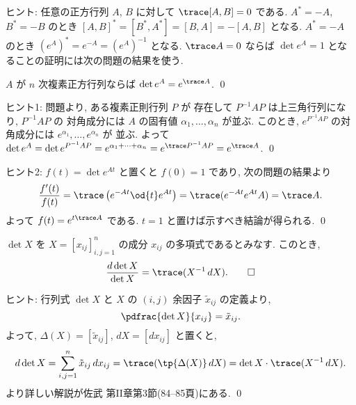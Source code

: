 \documentclass[12pt,twoside]{jarticle}
\begin{document}
\noindent
ヒント: 任意の正方行列 $A$, $B$ に対して $\trace[A,B]=0$ である.
$A^*=-A$, $B^*=-B$ のとき $[A,B]^*=[B^*,A^*]=[B,A]=-[A,B]$ となる.
$A^*=-A$ のとき $(e^A)^* = e^{-A}=(e^A)^{-1}$ となる.
$\trace A=0$ ならば $\det e^A = 1$ となることの証明には次の問題の結果を使う.


\begin{question}
  $A$ が $n$ 次複素正方行列ならば $\det e^A = e^{\trace A}$. \qed
\end{question}

\noindent
ヒント1: 問題より, ある複素正則行列 $P$ が
存在して $P^{-1}AP$ は上三角行列になり, $P^{-1}AP$ の
対角成分には $A$ の固有値 $\alpha_1,\dots,\alpha_n$ が並ぶ.
このとき, $e^{P^{-1}AP}$ の対角成分には $e^{\alpha_1},\dots,e^{\alpha_n}$ が
並ぶ.  よって $\det e^A = \det e^{P^{-1}AP} = e^{\alpha_1+\cdots+\alpha_n}
= e^{\trace P^{-1}AP} = e^{\trace A}$. 
\qed

\medskip
\noindent
ヒント2: $f(t)=\det e^{At}$ と置くと $f(0)=1$ であり, 
次の問題の結果より
\begin{equation*}
  \frac{f'(t)}{f(t)} 
  = \trace\left(e^{-At}\od{t}e^{At}\right) 
  = \trace(e^{-At}e^{At}A) 
  = \trace A.
\end{equation*}
よって $f(t)=e^{t\trace A}$ である. $t=1$ と置けば示すべき結論が得られる.
\qed


\begin{question}
\label{q:ddet}
  $\det X$ を $X=[x_{ij}]_{i,j=1}^n$ の成分 $x_{ij}$ の多項式であるとみなす.
  このとき,
  \begin{equation*}
    \frac{d\det X}{\det X} = \trace(X^{-1}\,dX).
    \qed
  \end{equation*}
\end{question}

\noindent
ヒント: 行列式 $\det X$ と $X$ の $(i,j)$ 余因子 $\tilde{x}_{ij}$ の定義より, 
\begin{equation*}
  \pdfrac{\det X}{x_{ij}} = \tilde{x}_{ij}.
\end{equation*}
よって, $\Delta(X)=[\tilde{x}_{ij}]$, $dX=[dx_{ij}]$ と置くと,
\begin{equation*}
  d\det X = \sum_{i,j=1}^n \tilde{x}_{ij}\,dx_{ij}
  = \trace(\tp{\Delta(X)}\,dX)
  = \det X \cdot \trace(X^{-1}\,dX).
\end{equation*}
より詳しい解説が佐武 \cite{satake} 第II章第3節(84--85頁)にある.
\qed
\end{document}
